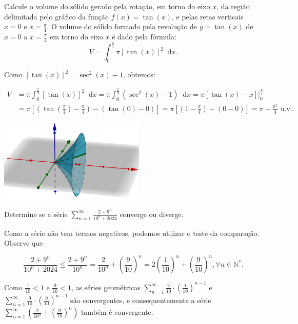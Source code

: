 \documentclass[12pt,a4paper]{article}
\newcommand*\diff{\mathop{}\!\mathrm{d}}
\begin{document}
\begin{ExerciseList}
\Exercise[title={2,5}] Calcule o volume do sólido gerado pela rotação, em torno do eixo $x$, da região delimitada pelo gráfico da função $f(x) = \tan(x)$, e pelas retas verticais $x = 0$ e $x = \frac{\pi}{4}$.
\Answer O volume do sólido formado pela revolução de \( y = \tan(x) \) de \( x = 0 \) a \( x = \frac{\pi}{4} \) em torno do eixo $x$ é dado pela fórmula:
\[
V = \int_0^{\frac{\pi}{4}} \pi [\tan(x)]^2 \diff{x}.
\]

Como \( [\tan(x)]^2 = \sec^2(x) - 1 \), obtemos:

\begin{align*}
    V
    &
    = \pi \int_0^{\frac{\pi}{4}} [\tan(x)]^2 \diff{x}
    = \pi \int_0^{\frac{\pi}{4}} (\sec^2(x) - 1) \diff{x}
    = \pi [ \tan(x) - x ] \bigg|_0^{\frac{\pi}{4}} \\
    &
    = \pi \left[ \left( \tan\left(\frac{\pi}{4}\right) - \frac{\pi}{4} \right) - \left( \tan(0) - 0 \right) \right]
    = \pi \left[ \left( 1 - \frac{\pi}{4} \right) - \left( 0 - 0 \right)\right]
    = \boxed{\pi - \frac{\pi^2}{4} \text{ u.v.}}.
\end{align*}

\begin{center}
    \includegraphics[height=4cm]{img/1-sólido-de-revolução.png}
\end{center}

\Exercise[title={2,5}] Determine se a série \(\sum_{n=1}^{\infty} \frac{2+9^n}{10^n + 2024}\) converge ou diverge.

\Answer Como a série não tem termos negativos, podemos utilizar o teste da comparação. Observe que

\[
\frac{2+9^n}{10^n + 2024}
\leq \frac{2+9^n}{10^n}
= \frac{2}{10^n} + \left(\frac{9}{10}\right)^n
= 2 \left(\frac{1}{10}\right)^n + \left(\frac{9}{10}\right)^n, \forall n \in \mathbb{N}^*.
\]

Como \(\frac{1}{10} < 1\) e \(\frac{9}{10} < 1\), as séries geométricas
\(\sum_{n=1}^{\infty} \frac{2}{10} \cdot \left(\frac{1}{10}\right)^{n-1}\)
e
\(\sum_{n=1}^{\infty} \frac{9}{10} \cdot \left(\frac{9}{10}\right)^{n-1}\)
são convergentes, e consequentemente a série
\(\sum_{n=1}^{\infty} \left(\frac{2}{10^n} + \left(\frac{9}{10}\right)^n\right)\)
também é convergente.


\end{ExerciseList}
\end{document}
